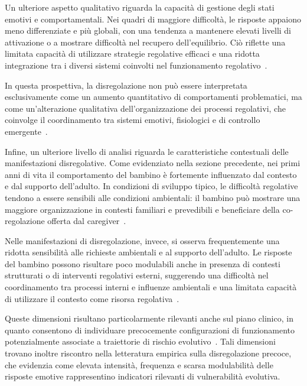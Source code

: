             Un ulteriore aspetto qualitativo riguarda la capacità di gestione degli stati emotivi e comportamentali. Nei quadri di maggiore difficoltà, le risposte appaiono meno differenziate e più globali, con una tendenza a mantenere elevati livelli di attivazione o a mostrare difficoltà nel recupero dell'equilibrio. Ciò riflette una limitata capacità di utilizzare strategie regolative efficaci e una ridotta integrazione tra i diversi sistemi coinvolti nel funzionamento regolativo~\cite{tronick2011}.

            In questa prospettiva, la disregolazione non può essere interpretata esclusivamente come un aumento quantitativo di comportamenti problematici, ma come un'alterazione qualitativa dell'organizzazione dei processi regolativi, che coinvolge il coordinamento tra sistemi emotivi, fisiologici e di controllo emergente~\cite{beauchaine2019,blair2015}.

            Infine, un ulteriore livello di analisi riguarda le caratteristiche contestuali delle manifestazioni disregolative. Come evidenziato nella sezione precedente, nei primi anni di vita il comportamento del bambino è fortemente influenzato dal contesto e dal supporto dell'adulto. In condizioni di sviluppo tipico, le difficoltà regolative tendono a essere sensibili alle condizioni ambientali: il bambino può mostrare una maggiore organizzazione in contesti familiari e prevedibili e beneficiare della co-regolazione offerta dal caregiver~\cite{tronick2011}.

            Nelle manifestazioni di disregolazione, invece, si osserva frequentemente una ridotta sensibilità alle richieste ambientali e al supporto dell'adulto. Le risposte del bambino possono risultare poco modulabili anche in presenza di contesti strutturati o di interventi regolativi esterni, suggerendo una difficoltà nel coordinamento tra processi interni e influenze ambientali e una limitata capacità di utilizzare il contesto come risorsa regolativa~\cite{morris2007}.

            Queste dimensioni risultano particolarmente rilevanti anche sul piano clinico, in quanto consentono di individuare precocemente configurazioni di funzionamento potenzialmente associate a traiettorie di rischio evolutivo~\cite{beauchaine2015,cole1994}. Tali dimensioni trovano inoltre riscontro nella letteratura empirica sulla disregolazione precoce, che evidenzia come elevata intensità, frequenza e scarsa modulabilità delle risposte emotive rappresentino indicatori rilevanti di vulnerabilità evolutiva.

